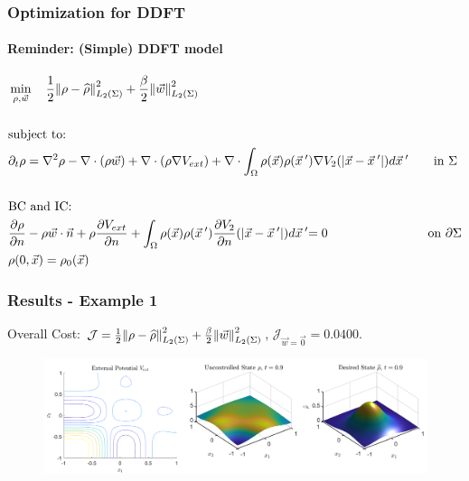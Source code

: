 \documentclass[aspectratio=169,xcolor=dvipsnames]{beamer}
\begin{document}
\begin{frame}
	\frametitle{Optimization for DDFT}
	\framesubtitle{Reminder: (Simple) DDFT model}
	\begin{align*}
		&\min_{\rho,\vec{w}} \quad \frac{1}{2}\norm{\rho- \widehat{\rho}}_{L_2(\Sigma)}^2 + \frac{\beta}{2} \norm{ {\vec{w}}}_{L_2(\Sigma)}^2\\
		\\
		&\text{subject to:}
		\\
		& \partial_t \rho = \nabla^2 \rho - \nabla \cdot (\rho  {\vec{w}}) + \nabla \cdot \left( \rho \nabla V_{ext} \right) + {\nabla \cdot \int_\Omega \rho(\vec{x}) \rho(\vec{x}\hspace{0.2em}') \nabla V_2(|\vec{x}-\vec{x}\hspace{0.2em}'|)d\vec{x}\hspace{0.2em}'} \qquad { \text{in    } \Sigma}\\
		\\
		&{\text{BC } \text{and IC:}}\\
		&\frac{\partial \rho}{\partial n} - \rho  {\vec{w}} \cdot \vec{n} + \rho \frac{\partial V_{ext}}{\partial n} + { \int_\Omega \rho(\vec{x}) \rho(\vec{x}\hspace{0.2em}')  \frac{ \partial  V_2}{\partial n}(|\vec{x}-\vec{x}\hspace{0.2em}'|)d\vec{x}\hspace{0.2em}'} {= 0 \quad \quad \qquad \qquad \qquad \text{on   } \partial \Sigma  } \\
		&{\rho(0,\vec{x}) = \rho_0(\vec{x})} 
	\end{align*}
	
\end{frame}

\begin{frame}
	\frametitle{Results - Example 1}
	Overall Cost: $\mathcal J = \frac{1}{2}\norm{\rho- \widehat{\rho}}_{L_2(\Sigma)}^2 + \frac{\beta}{2} \norm{\vec{w}}_{L_2(\Sigma)}^2$, $\mathcal J_{\vec{w}= \vec 0} = 0.0400$.
    \vspace{0.3 cm}
	\begin{figure}
		\includegraphics[width=14.5cm]{Figure32Db.png}
	\end{figure}
	
\end{frame}
\end{document}
